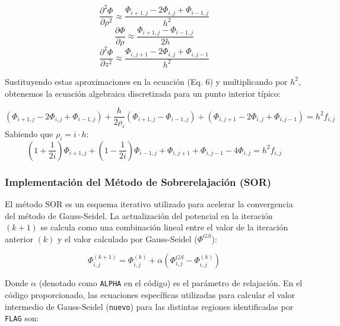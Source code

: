 \begin{equation}
    \frac{\partial^2 \Phi}{\partial \rho^2} \approx \frac{\Phi_{i+1,j} - 2\Phi_{i,j} + \Phi_{i-1,j}}{h^2}
\end{equation}
\begin{equation}
    \frac{\partial \Phi}{\partial \rho} \approx \frac{\Phi_{i+1,j} - \Phi_{i-1,j}}{2h}
\end{equation}
\begin{equation}
    \frac{\partial^2 \Phi}{\partial z^2} \approx \frac{\Phi_{i,j+1} - 2\Phi_{i,j} + \Phi_{i,j-1}}{h^2}
\end{equation}

Sustituyendo estas aproximaciones en la ecuación (Eq. 6) y multiplicando por $h^2$, obtenemos la ecuación algebraica discretizada para un punto interior típico:

\begin{equation}
    (\Phi_{i+1,j} - 2\Phi_{i,j} + \Phi_{i-1,j}) + \frac{h}{2\rho_i}(\Phi_{i+1,j} - \Phi_{i-1,j}) + (\Phi_{i,j+1} - 2\Phi_{i,j} + \Phi_{i,j-1}) = h^2 f_{i,j}
\end{equation}
Sabiendo que $\rho_i = i \cdot h$:
\begin{equation}
    \left(1 + \frac{1}{2i}\right)\Phi_{i+1,j} + \left(1 - \frac{1}{2i}\right)\Phi_{i-1,j} + \Phi_{i,j+1} + \Phi_{i,j-1} - 4\Phi_{i,j} = h^2 f_{i,j}
\end{equation}

\subsubsection{Implementación del Método de Sobrerelajación (SOR)}
El método SOR es un esquema iterativo utilizado para acelerar la convergencia del método de Gauss-Seidel. La actualización del potencial en la iteración $(k+1)$ se calcula como una combinación lineal entre el valor de la iteración anterior $(k)$ y el valor calculado por Gauss-Seidel ($\Phi^{GS}$):

\begin{equation}
    \Phi_{i,j}^{(k+1)} = \Phi_{i,j}^{(k)} + \alpha(\Phi_{i,j}^{GS} - \Phi_{i,j}^{(k)})
\end{equation}

Donde $\alpha$ (denotado como \texttt{ALPHA} en el código) es el parámetro de relajación. En el código proporcionado, las ecuaciones específicas utilizadas para calcular el valor intermedio de Gauss-Seidel (\texttt{nuevo}) para las distintas regiones identificadas por \texttt{FLAG} son:

